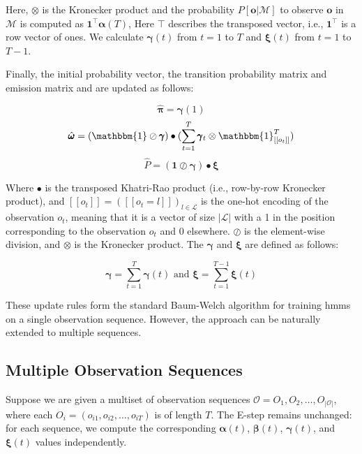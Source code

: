 Here, $\otimes$ is the Kronecker product and the probability $P[\mathbf{o} | \mathcal{M}]$ to observe $\mathbf{o}$ in $\mathcal{M}$ is computed as $\mathbf{1}^\top \pmb{\alpha}(T)$, Here $\top$ describes the transposed vector, i.e., $\mathbf{1}^\top$ is a row vector of ones.
We calculate $\pmb{\gamma}(t)$ from $t= 1$ to $T$ and $\pmb{\xi}(t)$ from $t= 1$ to $T-1$.

Finally, the initial probability vector, the transition probability matrix and emission matrix and are updated as follows:


\begin{equation}
    \hat{\pmb{\pi}} = \pmb{\gamma}(1)
    \label{eq:initial-probabilities-update}
\end{equation}
\begin{equation}
    \hat{\pmb{\omega}} = (\mathbbm{1} \oslash \pmb{\gamma}) \bullet (\sum_{t=1}^{T} \pmb{\gamma}_t \otimes \mathbbm{1}_{[[o_t]]}^{T})
    \label{eq:emission-probabilities-update}
\end{equation}
\begin{equation}
    \hat{P} = (\mathbf{1} \oslash \pmb{\gamma} ) \bullet \pmb{\xi}
    \label{eq:transition-probabilities-update}
\end{equation}


Where $\bullet$ is the transposed Khatri-Rao product (i.e., row-by-row Kronecker product), and $[[o_t]] = ([[o_t=l]])_{l \in \mathcal{L}}$ is the one-hot encoding of the observation $o_t$, meaning that it is a vector of size $|\mathcal{L}|$ with a 1 in the position corresponding to the observation $o_t$ and 0 elsewhere.
$\oslash$ is the element-wise division, and $\otimes$ is the Kronecker product.
The $\pmb{\gamma}$ and $\pmb{\xi}$ are defined as follows:


\begin{equation}
    \pmb{\gamma} = \sum_{t=1}^{T} \pmb{\gamma}(t) \text{ and } \pmb{\xi} = \sum_{t=1}^{T-1} \pmb{\xi}(t)
    \label{eq:gamma-xi-definitions}
\end{equation}


These update rules form the standard Baum-Welch algorithm for training \glspl{hmm} on a single observation sequence.
However, the approach can be naturally extended to multiple sequences.

\subsection{Multiple Observation Sequences}\label{subsec:multiple-observation-sequences}
Suppose we are given a multiset of observation sequences $\mathcal{O} = {O_1, O_2, \ldots, O_{|\mathcal{O}|}}$, where each $O_i = (o_{i1}, o_{i2}, \ldots, o_{iT})$ is of length $T$.
The E-step remains unchanged: for each sequence, we compute the corresponding $\pmb{\alpha}(t)$, $\pmb{\beta}(t)$, $\pmb{\gamma}(t)$, and $\pmb{\xi}(t)$ values independently.

